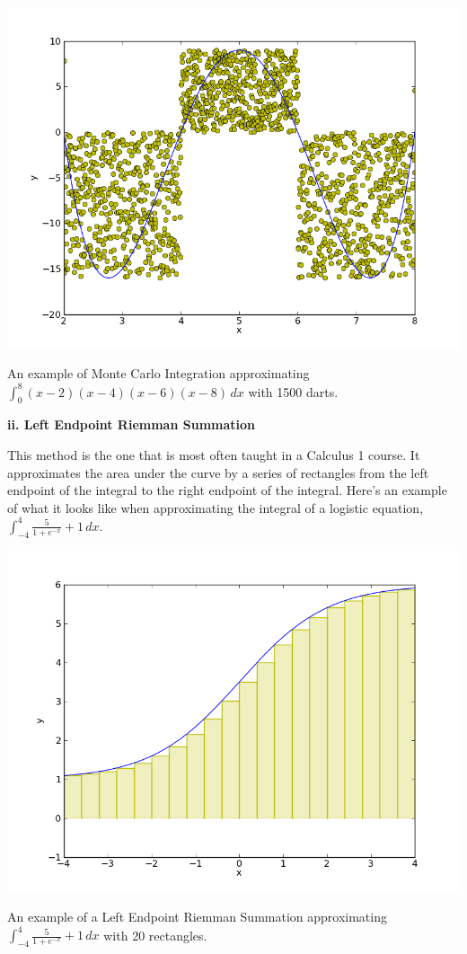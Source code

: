 \documentclass[12pt]{article}
\newcommand{\newLine}{\vspace{5mm}}
\newcommand{\nextsubsection}[1]{\newLine \noindent \large \textbf{#1} \normalsize}
\newcommand{\integral}[3]{\text{$\int^{#2}_{#1} #3\,dx$}}
\begin{document}
\begin{center} \includegraphics[scale = 0.5]{polynomialMonteCarlo.png} 

\small An example of Monte Carlo Integration approximating $\integral{0}{8}{(x-2)(x-4)(x-6)(x-8)}$ with 1500 darts. \normalsize
\end{center}

\nextsubsection{ii. Left Endpoint Riemman Summation}

\newLine This method is the one that is most often taught in a Calculus 1 course. It approximates the area under the curve by a series of rectangles from the left endpoint of the integral to the right endpoint of the integral. Here's an example of what it looks like when approximating the integral of a logistic equation, $\displaystyle\int^{4}_{-4} \frac{5}{1 +e^{-x}}+1\,dx$.

\begin{center} \includegraphics[scale = 0.5]{logisticLeftRiemman.png} 

\small An example of a Left Endpoint Riemman Summation approximating $\int^{4}_{-4} \frac{5}{1 +e^{-x}}+1\,dx$ with 20 rectangles.\normalsize
\end{center}
\end{document}
